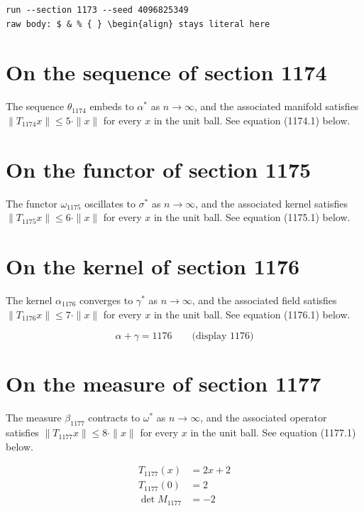 \documentclass{article}
\begin{document}
\begin{verbatim}
run --section 1173 --seed 4096825349
raw body: $ & % { } \begin{align} stays literal here
\end{verbatim}

\section{On the sequence of section 1174}
The sequence $\theta_{1174}$ embeds to $\alpha^{*}$ as $n \to \infty$,
and the associated manifold satisfies $\|T_{1174} x\| \leq 5 \cdot \|x\|$
for every $x$ in the unit ball. See equation (1174.1) below.

\section{On the functor of section 1175}
The functor $\omega_{1175}$ oscillates to $\sigma^{*}$ as $n \to \infty$,
and the associated kernel satisfies $\|T_{1175} x\| \leq 6 \cdot \|x\|$
for every $x$ in the unit ball. See equation (1175.1) below.

\section{On the kernel of section 1176}
The kernel $\alpha_{1176}$ converges to $\gamma^{*}$ as $n \to \infty$,
and the associated field satisfies $\|T_{1176} x\| \leq 7 \cdot \|x\|$
for every $x$ in the unit ball. See equation (1176.1) below.

$$
\alpha + \gamma = 1176 \qquad \text{(display 1176)}
$$

\section{On the measure of section 1177}
The measure $\beta_{1177}$ contracts to $\omega^{*}$ as $n \to \infty$,
and the associated operator satisfies $\|T_{1177} x\| \leq 8 \cdot \|x\|$
for every $x$ in the unit ball. See equation (1177.1) below.

\begin{align}
T_{1177}(x) &= 2 x + 2 \\
T_{1177}(0) &= 2 \\
\det M_{1177} &= -2
\end{align}
\end{document}
